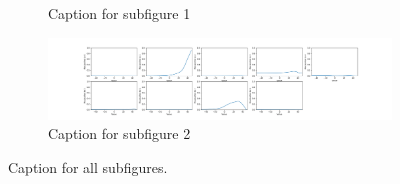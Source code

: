 \begin{figure}[htb!]
\begin{subfigure}[b]{\textwidth}
            \caption{Caption for subfigure 1}
            \label{fig:Shade-misclass0}
        \end{subfigure}
        \begin{subfigure}[b]{ \textwidth}
            \centering
            \includegraphics[width=\textwidth]{chapters/results/CNN/Shade/acc10.png}
            \caption{Caption for subfigure 2}
            \label{fig:Shade-misclass1}
        \end{subfigure}
        \caption{Caption for all subfigures.}
        \label{fig:Shade-misclassifications}
    \end{figure}
        
\clearpage
